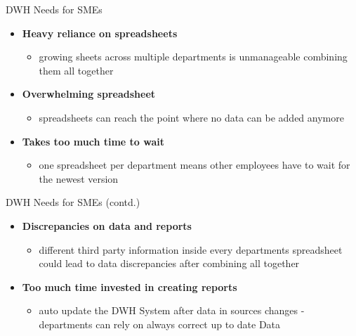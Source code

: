 \documentclass[aspectratio=169]{beamer}
\begin{document}
  \begin{frame}{DWH Needs for SMEs}
    
    \begin{itemize}
      \item \textbf{Heavy reliance on spreadsheets}
      	\begin{itemize}
      	   \item growing sheets across multiple departments is unmanageable combining them all together
      	\end{itemize}
      \item \textbf{Overwhelming spreadsheet}
		\begin{itemize}
		   \item spreadsheets can reach the point where no data can be added anymore
      	\end{itemize}
      \item \textbf{Takes too much time to wait}
      	\begin{itemize}
      	   \item one spreadsheet per department means other employees have to wait for the newest version
      	\end{itemize}
    \end{itemize}
  \end{frame}
  
  \begin{frame}{DWH Needs for SMEs (contd.)}
    \begin{itemize}
      \item \textbf{Discrepancies on data and reports}
      	\begin{itemize}
      	   \item different third party information inside every departments spreadsheet could lead to data discrepancies after combining all together
      	\end{itemize}
      \item \textbf{Too much time invested in creating reports}
        \begin{itemize}
      	   \item auto update the DWH System after data in sources changes - departments can rely on always correct up to date Data
      	\end{itemize}
    \end{itemize}
  \end{frame}
\end{document}
